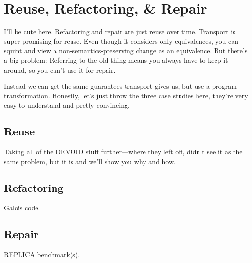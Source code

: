 \section{Reuse, Refactoring, \& Repair}

I'll be cute here. Refactoring and repair are just reuse over time.
Transport is super promising for reuse.
Even though it considers only equivalences, you can squint and view a non-semantics-preserving
change as an equivalence.
But there's a big problem:
Referring to the old thing means you always have to keep it around,
so you can't use it for repair.

Instead we can get the same guarantees transport gives us, but use a
program transformation. 
Honestly, let's just throw the three case studies here, they're very easy
to understand and pretty convincing.

\subsection{Reuse}

Taking all of the DEVOID stuff further---where they left off, didn't see it as the same problem,
but it is and we'll show you why and how.

\subsection{Refactoring}

Galois code.

\subsection{Repair}

REPLICA benchmark(s).

